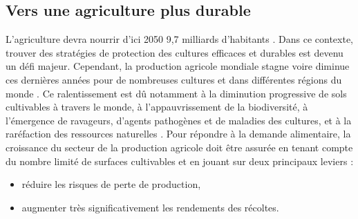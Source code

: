 

\subsection{Vers une agriculture plus  durable}
	 
	L'agriculture devra nourrir d'ici 2050 9,7 milliards d'habitants \citep{Gerland2014}. 
Dans ce contexte, trouver des stratégies de protection des cultures efficaces et durables
est devenu un défi majeur.
Cependant,  la production agricole mondiale stagne  voire diminue ces dernières années
pour de nombreuses cultures et
dans différentes régions du monde \citep{Brisson2010, Ray2012,
Grassini2013, Cassman2010}. Ce ralentissement est dû notamment à la diminution progressive
de sols cultivables à travers le monde, à l’appauvrissement de la biodiversité, à l'émergence de ravageurs, d'agents pathogènes et de  maladies des cultures, et  à la raréfaction des ressources naturelles \citep{Cordell2009}. 
Pour répondre à la demande alimentaire, la croissance du  secteur de la production agricole doit être assurée  en tenant compte du nombre limité de surfaces cultivables et en jouant sur deux principaux leviers \citep{Movahedi2009} :
\begin{itemize}[nosep]
\item réduire les risques de perte de production,
\item augmenter très significativement les rendements des récoltes.
\end{itemize}

